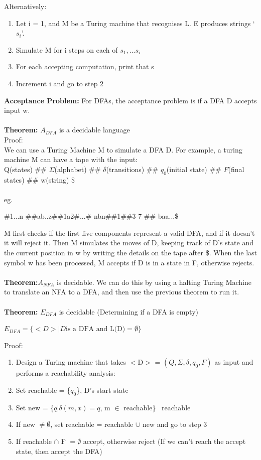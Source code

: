 \documentclass[a4paper,10pt]{article}
\begin{document}
Alternatively: \\ 
\begin{enumerate}
\item Let i = 1, and M be a Turing machine that recognises L. E produces strings `$s_{i}$'. 
\item Simulate M for i steps on each of $s_{1},...s_{i}$
\item For each accepting computation, print that s 
\item Increment i and go to step 2 
\end{enumerate}
\textcolor{Peach}{\textbf{Acceptance Problem:}} For DFAs, the acceptance problem is if a DFA D accepts input w. \\\\
\textcolor{Peach}{\textbf{Theorem:}} $A_{DFA}$ is a decidable language\\
Proof: \\ 
We can use a Turing Machine M to simulate a DFA D. For example, a turing machine M can have a tape with the input: \\ 
Q(states) \#\# $\Sigma$(alphabet) \#\# $\delta$(transitions) \#\# $q_{0}$(initial state) \#\# $F$(final states) \#\# w(string) \$ \\ \\
eg.
\begin{center}
\#1...n \#\#ab..z\#\#1a2\#...\# nbn\#\#1\#\#3 7 \#\# baa...\$
\end{center}
M first checks if the first five components represent a valid DFA, and if it doesn't it will reject it. Then M simulates the moves of D, keeping track of D's state and the current position in w by writing the details on the tape after \$. When the last symbol w has been processed, M accepts if D is in a state in F, otherwise rejects. \\\\
\textcolor{Peach}{\textbf{Theorem:}}$A_{NFA}$ is decidable. We can do this by using a halting Turing Machine to translate an NFA to a DFA, and then use the previous theorem to run it. \\\\
\textcolor{Peach}{\textbf{Theorem:}} $E_{DFA}$ is decidable (Determining if a DFA is empty)\\
\begin{center}
$E_{DFA} = \{<D> | D \textrm{is a DFA and L(D)} = \emptyset\}$
\end{center}
Proof:
\begin{enumerate}
\item Design a Turing machine that takes $<$D$>$ = $(Q, \Sigma, \delta, q_{0}, F)$ as input and performs a reachability analysis: 
\item Set reachable = \{$q_{0}$\}, D's start state 
\item Set new = \{$q | \delta(m,x) = q$, m $\in$ reachable\} \ reachable 
\item If new $\neq \emptyset$, set reachable = reachable $\cup$ new and go to step 3 
\item If reachable $\cap$ F $= \emptyset$ accept, otherwise reject (If we can't reach the accept state, then accept the DFA)
\end{enumerate}
\end{document}
